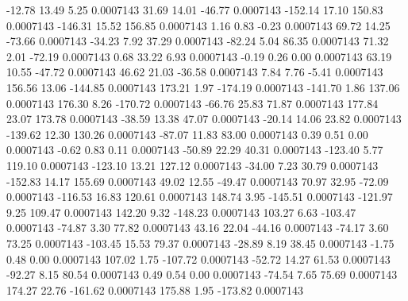       -12.78       13.49        5.25     0.0007143
       31.69       14.01      -46.77     0.0007143
     -152.14       17.10      150.83     0.0007143
     -146.31       15.52      156.85     0.0007143
        1.16        0.83       -0.23     0.0007143
       69.72       14.25      -73.66     0.0007143
      -34.23        7.92       37.29     0.0007143
      -82.24        5.04       86.35     0.0007143
       71.32        2.01      -72.19     0.0007143
        0.68       33.22        6.93     0.0007143
       -0.19        0.26        0.00     0.0007143
       63.19       10.55      -47.72     0.0007143
       46.62       21.03      -36.58     0.0007143
        7.84        7.76       -5.41     0.0007143
      156.56       13.06     -144.85     0.0007143
      173.21        1.97     -174.19     0.0007143
     -141.70        1.86      137.06     0.0007143
      176.30        8.26     -170.72     0.0007143
      -66.76       25.83       71.87     0.0007143
      177.84       23.07      173.78     0.0007143
      -38.59       13.38       47.07     0.0007143
      -20.14       14.06       23.82     0.0007143
     -139.62       12.30      130.26     0.0007143
      -87.07       11.83       83.00     0.0007143
        0.39        0.51        0.00     0.0007143
       -0.62        0.83        0.11     0.0007143
      -50.89       22.29       40.31     0.0007143
     -123.40        5.77      119.10     0.0007143
     -123.10       13.21      127.12     0.0007143
      -34.00        7.23       30.79     0.0007143
     -152.83       14.17      155.69     0.0007143
       49.02       12.55      -49.47     0.0007143
       70.97       32.95      -72.09     0.0007143
     -116.53       16.83      120.61     0.0007143
      148.74        3.95     -145.51     0.0007143
     -121.97        9.25      109.47     0.0007143
      142.20        9.32     -148.23     0.0007143
      103.27        6.63     -103.47     0.0007143
      -74.87        3.30       77.82     0.0007143
       43.16       22.04      -44.16     0.0007143
      -74.17        3.60       73.25     0.0007143
     -103.45       15.53       79.37     0.0007143
      -28.89        8.19       38.45     0.0007143
       -1.75        0.48        0.00     0.0007143
      107.02        1.75     -107.72     0.0007143
      -52.72       14.27       61.53     0.0007143
      -92.27        8.15       80.54     0.0007143
        0.49        0.54        0.00     0.0007143
      -74.54        7.65       75.69     0.0007143
      174.27       22.76     -161.62     0.0007143
      175.88        1.95     -173.82     0.0007143
